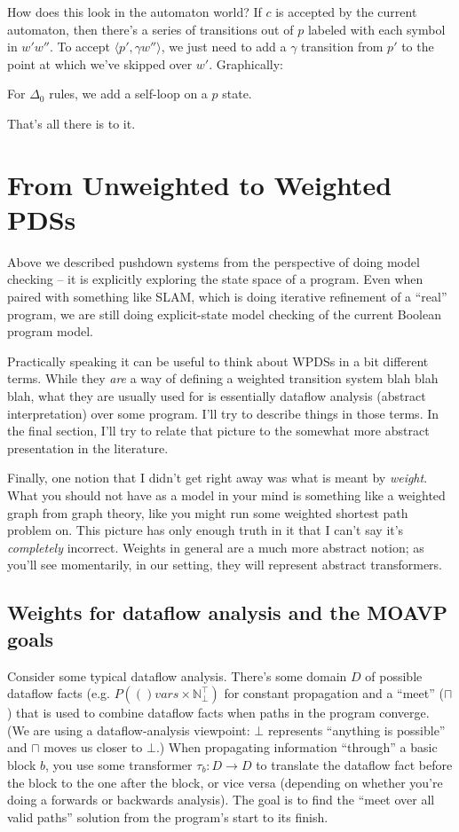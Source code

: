 \documentclass{article}
\newcommand{\Config}[2]{\ensuremath{\langle #1, #2 \rangle}}
\newcommand{\powerset}[1]{P(#1)}
\newcommand{\bbN}{\mathbb{N}}
\newcommand{\meet}{\sqcap}
\begin{document}
How does this look in the automaton world? If $c$ is accepted by the
current automaton, then there's a series of transitions out of $p$
labeled with each symbol in $w'w''$. To accept \Config{p'}{\gamma
  w''}, we just need to add a $\gamma$ transition from $p'$ to the
point at which we've skipped over $w'$. Graphically:



For $\Delta_0$ rules, we add a self-loop on a $p$ state.

That's all there is to it.


\section{From Unweighted to Weighted PDSs}

Above we described pushdown systems from the perspective of doing
model checking -- it is explicitly exploring the state space of a
program. Even when paired with something like SLAM, which is doing
iterative refinement of a ``real'' program, we are still doing
explicit-state model checking of the current Boolean program model.

Practically speaking it can be useful to think about WPDSs in a bit
different terms. While they \emph{are} a way of defining a weighted
transition system blah blah blah, what they are usually used for is
essentially dataflow analysis (abstract interpretation) over some
program. I'll try to describe things in those terms. In the final
section, I'll try to relate that picture to the somewhat more abstract
presentation in the literature.

Finally, one notion that I didn't get right away was what is meant by
\emph{weight}. What you should not have as a model in your mind is
something like a weighted graph from graph theory, like you might run
some weighted shortest path problem on. This picture has only enough
truth in it that I can't say it's \emph{completely} incorrect. Weights
in general are a much more abstract notion; as you'll see momentarily,
in our setting, they will represent abstract transformers.

\subsection{Weights for dataflow analysis and the MOAVP goals}

Consider some typical dataflow analysis. There's some domain $D$ of
possible dataflow facts (e.g. $\powerset(vars \times
\bbN_\bot^\top)$ for constant propagation and a ``meet'' ($\meet$)
that is used to combine dataflow facts when paths in the program
converge. (We are using a dataflow-analysis viewpoint: $\bot$
represents ``anything is possible'' and $\meet$ moves us closer to
$\bot$.) When propagating information ``through'' a basic block
$b$, you use some transformer $\tau_b: D \rightarrow D$ to translate
the dataflow fact before the block to the one after the block, or vice
versa (depending on whether you're doing a forwards or backwards
analysis). The goal is to find the ``meet over all valid paths''
solution from the program's start to its finish.
\end{document}
